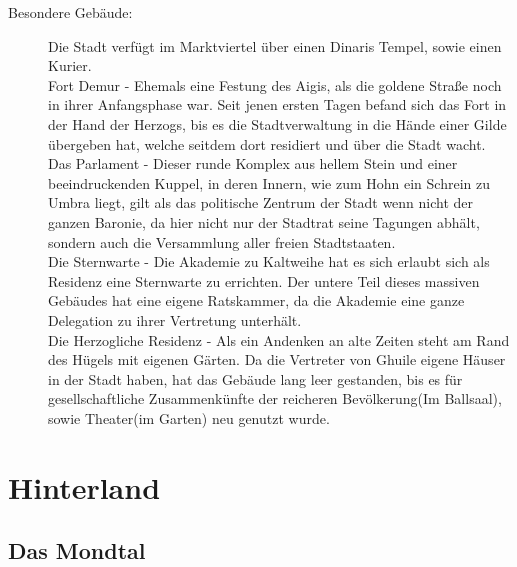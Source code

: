 \documentclass[a4paper,12pt,oneside]{book}
\begin{document}
\begin{description}
\item[Besondere Gebäude:]Die Stadt verfügt im Marktviertel über einen Dinaris Tempel, sowie einen Kurier.  
\\Fort Demur - Ehemals eine Festung des Aigis, als die goldene Straße noch in ihrer Anfangsphase war. Seit jenen ersten Tagen befand sich das Fort in der Hand der Herzogs, bis es die Stadtverwaltung in die Hände einer Gilde übergeben hat, welche seitdem dort residiert und über die Stadt wacht.
\\Das Parlament - Dieser runde Komplex aus hellem Stein und einer beeindruckenden Kuppel, in deren Innern, wie zum Hohn ein Schrein zu Umbra liegt, gilt als das politische Zentrum der Stadt wenn nicht der ganzen Baronie, da hier nicht nur der Stadtrat seine Tagungen abhält, sondern auch die Versammlung aller freien Stadtstaaten.
\\Die Sternwarte - Die Akademie zu Kaltweihe hat es sich erlaubt sich als Residenz eine Sternwarte zu errichten. Der untere Teil dieses massiven Gebäudes hat eine eigene Ratskammer, da die Akademie eine ganze Delegation zu ihrer Vertretung unterhält.
\\Die Herzogliche Residenz - Als ein Andenken an alte Zeiten steht am Rand des Hügels mit eigenen Gärten. Da die Vertreter von Ghuile eigene Häuser in der Stadt haben, hat das Gebäude lang leer gestanden, bis es für gesellschaftliche Zusammenkünfte der reicheren Bevölkerung(Im Ballsaal), sowie Theater(im Garten) neu genutzt wurde.
\end{description}

\section{Hinterland}

\subsection{Das Mondtal}
\end{document}
